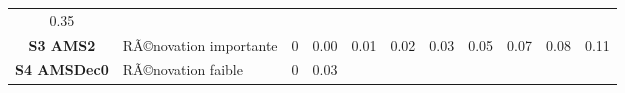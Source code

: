 \documentclass[]{article}
\begin{document}
\begin{longtable}[]{@{}clrrrrrrrrr@{}}
\begin{minipage}[t]{0.05\columnwidth}
0.35\strut
\end{minipage}\tabularnewline
\begin{minipage}[t]{0.12\columnwidth}\centering\strut
\textbf{S3 AMS2}\strut
\end{minipage} & \begin{minipage}[t]{0.17\columnwidth}\raggedright\strut
RÃ©novation importante\strut
\end{minipage} & \begin{minipage}[t]{0.05\columnwidth}\raggedleft\strut
0\strut
\end{minipage} & \begin{minipage}[t]{0.05\columnwidth}\raggedleft\strut
0.00\strut
\end{minipage} & \begin{minipage}[t]{0.05\columnwidth}\raggedleft\strut
0.01\strut
\end{minipage} & \begin{minipage}[t]{0.05\columnwidth}\raggedleft\strut
0.02\strut
\end{minipage} & \begin{minipage}[t]{0.05\columnwidth}\raggedleft\strut
0.03\strut
\end{minipage} & \begin{minipage}[t]{0.05\columnwidth}\raggedleft\strut
0.05\strut
\end{minipage} & \begin{minipage}[t]{0.05\columnwidth}\raggedleft\strut
0.07\strut
\end{minipage} & \begin{minipage}[t]{0.05\columnwidth}\raggedleft\strut
0.08\strut
\end{minipage} & \begin{minipage}[t]{0.05\columnwidth}\raggedleft\strut
0.11\strut
\end{minipage}\tabularnewline
\begin{minipage}[t]{0.12\columnwidth}\centering\strut
\textbf{S4 AMSDec0}\strut
\end{minipage} & \begin{minipage}[t]{0.17\columnwidth}\raggedright\strut
RÃ©novation faible\strut
\end{minipage} & \begin{minipage}[t]{0.05\columnwidth}\raggedleft\strut
0\strut
\end{minipage} & \begin{minipage}[t]{0.05\columnwidth}\raggedleft\strut
0.03\strut
\end{minipage} & \begin{minipage}[t]{0.05\columnwidth}\raggedleft\strut

\end{minipage}
\end{longtable}
\end{document}
